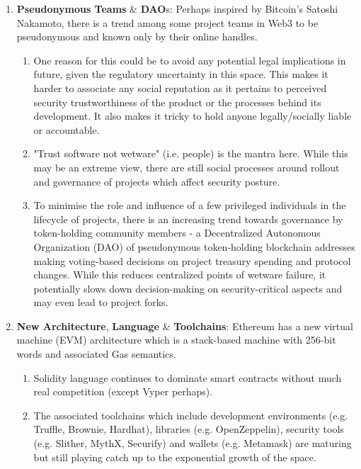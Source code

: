 \begin{enumerate}
\item\textbf{Pseudonymous Teams} \& \textbf{DAO}s: Perhaps inspired by Bitcoin's Satoshi Nakamoto, there is a trend among some project teams in Web3 to be pseudonymous and known only by their online handles.
\begin{enumerate}
\item One reason for this could be to avoid any potential legal implications in future, given the regulatory uncertainty in this space. This makes it harder to associate any social reputation as it pertains to perceived security trustworthiness of the product or the processes behind its development. It also makes it tricky to hold anyone legally/socially liable or accountable.
\item "Trust software not wetware" (i.e. people) is the mantra here. While this may be an extreme view, there are still social processes around rollout and governance of projects which affect security posture.
\item To minimise the role and influence of a few privileged individuals in the lifecycle of projects, there is an increasing trend towards governance by token-holding community members - a Decentralized Autonomous Organization (DAO) of pseudonymous token-holding blockchain addresses making voting-based decisions on project treasury spending and protocol changes. While this reduces centralized points of wetware failure, it potentially slows down decision-making on security-critical aspects and may even lead to project forks.
\end{enumerate}

\item\textbf{New Architecture}, \textbf{Language} \& \textbf{Toolchains}: Ethereum has a new virtual machine (EVM) architecture which is a stack-based machine with 256-bit words and associated Gas semantics.
\begin{enumerate}
\item Solidity language continues to dominate smart contracts without much real competition (except Vyper perhaps).
\item The associated toolchains which include development environments (e.g. Truffle, Brownie, Hardhat), libraries (e.g. OpenZeppelin), security tools (e.g. Slither, MythX, Securify) and wallets (e.g. Metamask) are maturing but still playing catch up to the exponential growth of the space.
\end{enumerate}


\end{enumerate}
